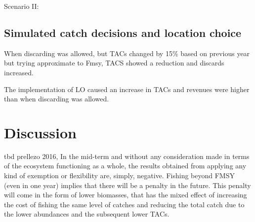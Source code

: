 \documentclass[12pt,oneline,a4paper,numbib]{ouparticle}
\numberwithin{equation}{subsection} %
\begin{document}

Scenario II:


\subsection{Simulated catch decisions and location choice}
\label{sec3.1}
When discarding was allowed, but TACs changed by 15\% based on previous year but trying approximate to Fmsy, TACS showed a reduction and discards increased. 

The implementation of LO caused an increase in TACs and revenues were higher than when discarding was allowed.



\newpage
\section{Discussion}
\label{sec4}
tbd
prellezo 2016, In the mid-term and without any consideration made in terms of the ecosystem functioning as a whole, the results obtained from applying any kind of exemption or flexibility are, simply, negative. Fishing beyond FMSY (even in one year) implies that there will be a penalty in the future. This penalty will come in the form of lower biomasses, that has the mixed effect of increasing the cost of fishing the same level of catches and reducing the total catch due to the lower abundances and the subsequent lower TACs.
\end{document}
